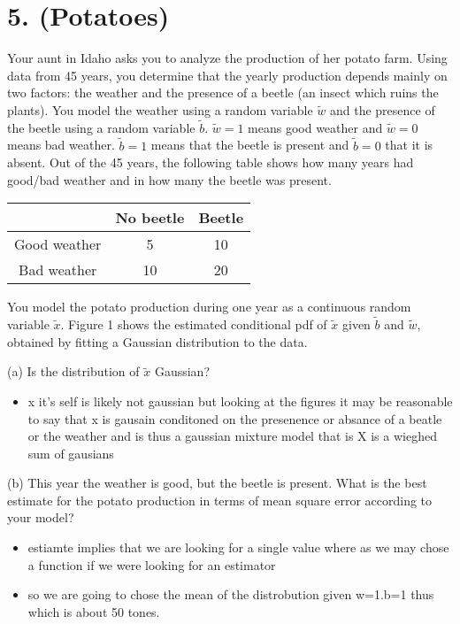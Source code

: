 \documentclass[10pt]{article}
\begin{document}
\section{5. (Potatoes)}
Your aunt in Idaho asks you to analyze the production of her potato farm. Using data from 45 years, you determine that the yearly production depends mainly on two factors: the weather and the presence of a beetle (an insect which ruins the plants). You model the weather using a random variable $\tilde{w}$ and the presence of the beetle using a random variable $\tilde{b}$. $\tilde{w}=1$ means good weather and $\tilde{w}=0$ means bad weather. $\tilde{b}=1$ means that the beetle is present and $\tilde{b}=0$ that it is absent. Out of the 45 years, the following table shows how many years had good/bad weather and in how many the beetle was present.

\begin{center}
\begin{tabular}{|c|c|c|}
\hline
 & No beetle & Beetle \\
\hline
Good weather & 5 & 10 \\
\hline
Bad weather & 10 & 20 \\
\hline
\end{tabular}
\end{center}

You model the potato production during one year as a continuous random variable $\tilde{x}$. Figure 1 shows the estimated conditional pdf of $\tilde{x}$ given $\tilde{b}$ and $\tilde{w}$, obtained by fitting a Gaussian distribution to the data.

(a) Is the distribution of $\tilde{x}$ Gaussian?
\begin{itemize}
    \item x it's self is likely not gaussian but looking at the figures it may be reasonable to say
    that x is gausain conditoned on the presenence or absance of a beatle or the weather and is thus a gaussian mixture model that is X is a wieghed sum of gausians 
\end{itemize}
(b) This year the weather is good, but the beetle is present. What is the best estimate for the potato production in terms of mean square error according to your model?
\begin{itemize}
    \item estiamte implies that we are looking for a single value where as we may chose a function if we were looking for an estimator
    \item so we are going to chose the mean of the distrobution given w=1.b=1 thus which is about 50 tones. 
\end{itemize}
\end{document}
